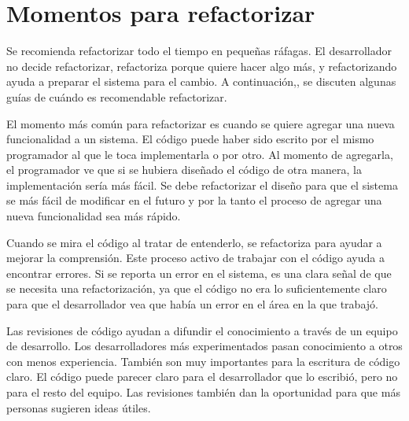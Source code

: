 \section{Momentos para refactorizar}
Se recomienda refactorizar todo el tiempo en pequeñas ráfagas. El desarrollador no decide
refactorizar, refactoriza porque quiere hacer algo más, y refactorizando ayuda a preparar el
sistema para el cambio. A continuación,, se discuten algunas guías de cuándo es recomendable
refactorizar.
\begin{enumerate}[label=\textbf{\arabic*}.]
	
	El momento más común para refactorizar es cuando se quiere agregar una nueva
	funcionalidad a un sistema. El código puede haber sido escrito por el mismo programador al
	que le toca implementarla o por otro. Al momento de agregarla, el programador ve que si se
	hubiera diseñado el código de otra manera, la implementación sería más fácil. Se debe
	refactorizar el diseño para que el sistema se más fácil de modificar en el futuro y por la tanto el
	proceso de agregar una nueva funcionalidad sea más rápido.

	
	
	Cuando se mira el código al tratar de entenderlo, se refactoriza para ayudar a mejorar la
	comprensión. Este proceso activo de trabajar con el código ayuda a encontrar errores. Si se
	reporta un error en el sistema, es una clara señal de que se necesita una refactorización, ya
	que el código no era lo suficientemente claro para que el desarrollador vea que había un error
	en el área en la que trabajó.

	
	
	Las revisiones de código ayudan a difundir el conocimiento a través de un equipo de
	desarrollo. Los desarrolladores más experimentados pasan conocimiento a otros con menos
	experiencia. También son muy importantes para la escritura de código claro. El código puede
	parecer claro para el desarrollador que lo escribió, pero no para el resto del equipo. Las
	revisiones también dan la oportunidad para que más personas sugieren ideas útiles. 
\end{enumerate}
